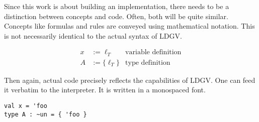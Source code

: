 Since this work is about building an implementation, there needs to be a distinction between concepts and code. Often, both will be quite similar. Concepts like formulas and rules are conveyed using mathematical notation. This is not necessarily identical to the actual syntax of LDGV.

\begin{align*}
 x &:= \ell_T & \text{variable definition} \\
 A &:= \{ \ell_T \} & \text{type definition}
\end{align*}

Then again, actual code precisely reflects the capabilities of LDGV. One can feed it verbatim to the interpreter. It is written in a monospaced font.

\begin{lstlisting}[language=ldgv,caption=LDGV: Source code example]
val x = 'foo
type A : ~un = { 'foo }
\end{lstlisting}
